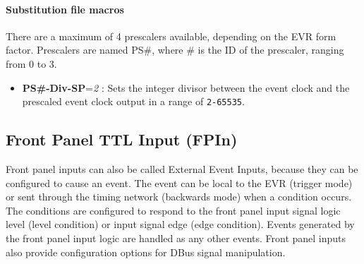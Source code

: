 \documentclass[12pt,a4paper]{article}
\begin{document}
\paragraph{Substitution file macros}
There are a maximum of 4 prescalers available, depending on the EVR form factor. Prescalers are named PS\#, where \# is the ID of the prescaler, ranging from 0 to 3.
\begin{itemize}
  \item
    \textbf{PS\#-Div-SP}=\emph{2} : Sets the integer divisor between the
    event clock and the prescaled event clock output in a range of
    \texttt{2-65535}.
  \end{itemize}


\subsection{Front Panel TTL Input (FPIn)}\label{sec:Front Panel TTL Input}
Front panel inputs can also be called External Event Inputs, because they can be configured to cause an event. The event can be local to the EVR (trigger mode) or sent through the timing network (backwards mode) when a condition occurs. The conditions are configured to respond to the front panel input signal logic level (level condition) or input signal edge (edge condition). Events generated by the front panel input logic are handled as any other events. Front panel inputs also provide configuration options for DBus signal manipulation.
\end{document}
